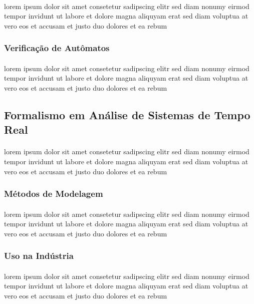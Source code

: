 \paragraph{}
lorem ipsum dolor sit amet consetetur sadipscing elitr sed diam nonumy
eirmod tempor invidunt ut labore et dolore magna aliquyam erat sed diam
voluptua at vero eos et accusam et justo duo dolores et ea rebum

\subsubsection{Verificação de Autômatos}
\paragraph{}
lorem ipsum dolor sit amet consetetur sadipscing elitr sed diam nonumy
eirmod tempor invidunt ut labore et dolore magna aliquyam erat sed diam
voluptua at vero eos et accusam et justo duo dolores et ea rebum

\subsection{Formalismo em Análise de Sistemas de Tempo Real}
\paragraph{}
lorem ipsum dolor sit amet consetetur sadipscing elitr sed diam nonumy
eirmod tempor invidunt ut labore et dolore magna aliquyam erat sed diam
voluptua at vero eos et accusam et justo duo dolores et ea rebum

\subsubsection{Métodos de Modelagem}
\paragraph{}
lorem ipsum dolor sit amet consetetur sadipscing elitr sed diam nonumy
eirmod tempor invidunt ut labore et dolore magna aliquyam erat sed diam
voluptua at vero eos et accusam et justo duo dolores et ea rebum

\subsubsection{Uso na Indústria}
\paragraph{}
lorem ipsum dolor sit amet consetetur sadipscing elitr sed diam nonumy
eirmod tempor invidunt ut labore et dolore magna aliquyam erat sed diam
voluptua at vero eos et accusam et justo duo dolores et ea rebum

